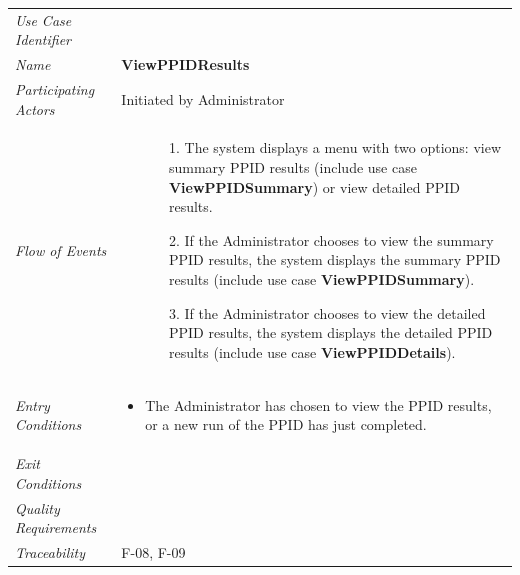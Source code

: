 \documentclass[12pt,letterpaper]{article}
\begin{document}
\begin{center}
	\begin{tabu} to 
		\toprule
		Use Case Identifier & \viewppidresults{} \\
		Name & {\bf ViewPPIDResults} \\
		Participating Actors & Initiated by Administrator \\
		Flow of Events & 
	    \begin{enumerate}[topsep=-1em,leftmargin=*]
		    \item[]
		    \begin{enumerate}
		        \item[1.] The system displays a menu with two options: view summary PPID results (include use case \textbf{ViewPPIDSummary}) or view detailed PPID results.
		        \item[2.] If the Administrator chooses to view the summary PPID results, the system displays the summary PPID results (include use case \textbf{ViewPPIDSummary}).
		        \item[3.] If the Administrator chooses to view the detailed PPID results, the system displays the detailed PPID results (include use case \textbf{ViewPPIDDetails}).
		    \end{enumerate}
		\end{enumerate} \\

		Entry Conditions &
		\begin{itemize}[topsep=-1em,leftmargin=*]
		    \item The Administrator has chosen to view the PPID results, or a new run of the PPID has just completed.
        \end{itemize} \\

		Exit Conditions & \\

		Quality Requirements & \\

		Traceability & F-08, F-09 \\
		\toprule
	\end{tabu}
\end{center}
\end{document}
